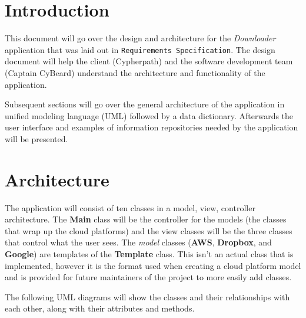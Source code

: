 \documentclass{article}
\title{}
\author{}
\date{}
\begin{document}



\tableofcontents
\newpage
\listoffigures
\newpage

\begin{versionhistory}
\end{versionhistory}
\newpage

\section{Introduction}
This document will go over the design and architecture for the \textit{Downloader} application that was laid out in
\texttt{Requirements Specification}\cite{reqs}. The design document will help the client (Cypherpath) and the
software development team (Captain CyBeard) understand the architecture and functionality of the application.

Subsequent sections will go over the general architecture of the application in unified modeling language
(UML) followed by a data dictionary. Afterwards the user interface and examples of information repositories needed
by the application will be presented.

\section{Architecture}
The application will consist of ten classes in a model, view, controller architecture. The \textbf{Main} class will be
the controller for the models (the classes that wrap up the cloud platforms) and the view classes will be the three
classes that control what the user sees. The \textit{model} classes (\textbf{AWS}, \textbf{Dropbox}, and \textbf{Google})
are templates of the \textbf{Template} class. This isn't an actual class that is implemented, however it is the format used
when creating a cloud platform model and is provided for future maintainers of the project to more easily add classes.

The following UML diagrams will show the classes and their relationships with
each other, along with their attributes and methods.
\end{document}
